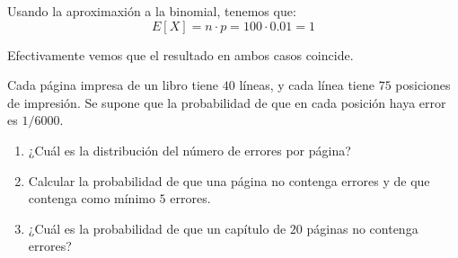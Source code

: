 \begin{ejercicio}
\begin{enumerate}
        Usando la aproximaxión a la binomial, tenemos que:
        \begin{equation*}
            E[X] = n \cdot p = 100 \cdot 0.01 = 1
        \end{equation*}

        Efectivamente vemos que el resultado en ambos casos coincide.
    \end{enumerate}
\end{ejercicio}

\begin{ejercicio}
    Cada página impresa de un libro tiene $40$ líneas, y cada línea tiene $75$ posiciones de impresión. Se
    supone que la probabilidad de que en cada posición haya error es $1/6000$.
    \begin{enumerate}
        \item ¿Cuál es la distribución del número de errores por página?
        \item Calcular la probabilidad de que una página no contenga errores y de que contenga como mínimo
        $5$ errores.
        \item ¿Cuál es la probabilidad de que un capítulo de $20$ páginas no contenga errores?
    \end{enumerate}
\end{ejercicio}

